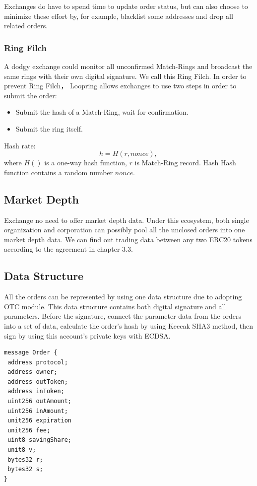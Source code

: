 \documentclass[UTF8,nofonts]{article}
\begin{document}
Exchanges do have to spend time to update order status, but can also choose to minimize these effort by, for example, blacklist some addresses and drop all related orders.

\subsubsection{Ring Filch}

A dodgy exchange could monitor all unconfirmed Match-Rings and broadcast the same rings with their own digital signature. We call this Ring Filch. In order to prevent Ring Filch， Loopring allows exchanges to use two steps in order to submit the order: 
\begin{itemize}
  \item Submit the hash of a Match-Ring, wait for confirmation.
  \item Submit the ring itself.
\end{itemize}
Hash rate:
$$h = H(r,  nonce)\text{, }$$
where $H()$ is a one-way hash function, $r$ is Match-Ring record. Hash Hash function contains a random number $nonce$.

\subsection{Market Depth\label{sec: marketdepth}}

Exchange no need to offer market depth data. Under this ecosystem,  both single organization and corporation can possibly pool all the unclosed orders into one market depth data. We can find out trading data between any two ERC20 tokens according to the agreement in chapter 3.3.

\subsection{Data Structure\label{sec: dataformat}}

All the orders can be represented by using one data structure due to adopting OTC module. This  data structure contains both digital signature and all parameters. Before the signature,  connect the parameter data from the orders into a set of data,  calculate the order's hash by using Keccak SHA3 method,  then sign by using this account's private keys with ECDSA.


\begin{verbatim}
message Order {
 address protocol;
 address owner;
 address outToken;
 address inToken;
 uint256 outAmount;
 uint256 inAmount;
 unit256 expiration
 unit256 fee;
 uint8 savingShare;
 unit8 v;
 bytes32 r;
 bytes32 s;
}
\end{verbatim}
\end{document}
